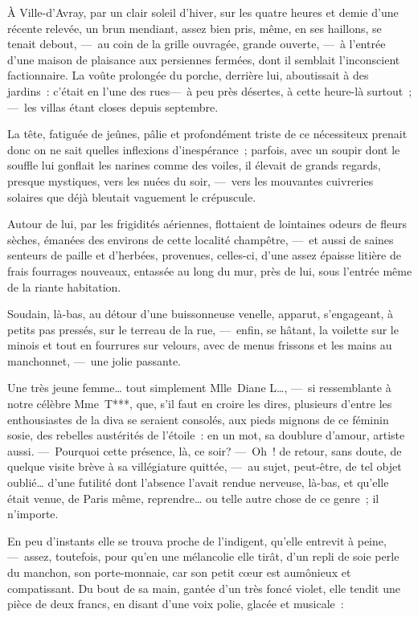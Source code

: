 \documentclass[french,twoside]{book} %
\begin{document}
À Ville-d’Avray, par un clair soleil d’hiver, sur les quatre heures et demie d’une récente relevée, un brun mendiant, assez bien pris, même, en ses haillons, se tenait debout, — au coin de la grille ouvragée, grande ouverte, — à l’entrée   d’une maison de plaisance aux persiennes fermées, dont il semblait l’inconscient factionnaire. La voûte prolongée du porche, derrière lui, aboutissait à des jardins : c’était en l’une des rues— à peu près désertes, à cette heure-là surtout ; — les villas étant closes depuis septembre.\par
La tête, fatiguée de jeûnes, pâlie et profondément triste de ce nécessiteux prenait donc on ne sait quelles inflexions d’inespérance ; parfois, avec un soupir dont le souffle lui gonflait les narines comme des voiles, il élevait de grands regards, presque mystiques, vers les nuées du soir, — vers les mouvantes cuivreries solaires que déjà bleutait vaguement le crépuscule.\par
Autour de lui, par les frigidités aériennes, flottaient de lointaines odeurs de fleurs sèches, émanées des environs de cette localité champêtre, — et aussi de saines senteurs de paille et d’herbées, provenues, celles-ci, d’une assez épaisse litière de frais fourrages nouveaux, entassée au long du mur, près de lui, sous l’entrée même de la riante habitation.\par
   Soudain, là-bas, au détour d’une buissonneuse venelle, apparut, s’engageant, à petits pas pressés, sur le terreau de la rue, — enfin, se hâtant, la voilette sur le minois et tout en fourrures sur velours, avec de menus frissons et les mains au manchonnet, — une jolie passante.\par
Une très jeune femme… tout simplement Mlle Diane L…, — si ressemblante à notre célèbre Mme T***, que, s’il faut en croire les dires, plusieurs d’entre les enthousiastes de la diva se seraient consolés, aux pieds mignons de ce féminin sosie, des rebelles austérités de l’étoile : en un mot, sa doublure d’amour, artiste aussi. — Pourquoi cette présence, là, ce soir? — Oh ! de retour, sans doute, de quelque visite brève à sa villégiature quittée, — au sujet, peut-être, de tel objet oublié… d’une futilité dont l’absence l’avait rendue nerveuse, là-bas, et qu’elle était venue, de Paris même, reprendre… ou telle autre chose de ce genre ; il n’importe.\par
En peu d’instants elle se trouva proche de l’indigent, qu’elle entrevit à peine, — assez, toutefois, pour qu’en une mélancolie elle tirât,   d’un repli de soie perle du manchon, son porte-monnaie, car son petit cœur est aumônieux et compatissant. Du bout de sa main, gantée d’un très foncé violet, elle tendit une pièce de deux francs, en disant d’une voix polie, glacée et musicale :\par
\end{document}
